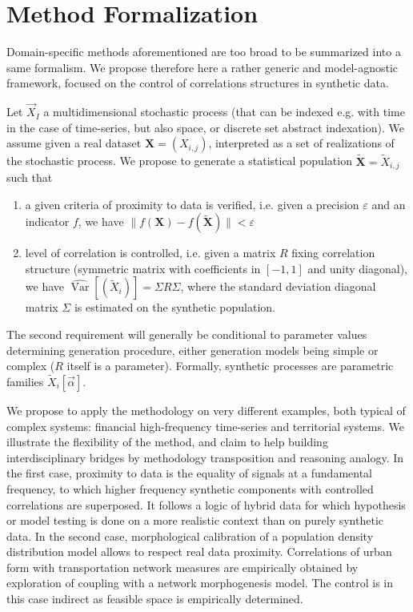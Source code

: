 \documentclass{article}
\DeclareMathOperator{\Var}{Var}
\newcommand{\norm}[1]{\| #1 \|}
\begin{document}
\section*{Method Formalization}


Domain-specific methods aforementioned are too broad to be summarized into a same formalism. We propose therefore here a rather generic and model-agnostic framework, focused on the control of correlations structures in synthetic data.

Let $\vec{X}_I$ a multidimensional stochastic process (that can be indexed e.g. with time in the case of time-series, but also space, or discrete set abstract indexation). We assume given a real dataset $\mathbf{X}=(X_{i,j})$, interpreted as a set of realizations of the stochastic process. We propose to generate a statistical population $\mathbf{\tilde{X}}=\tilde{X}_{i,j}$ such that
\begin{enumerate}
\item a given criteria of proximity to data is verified, i.e. given a precision $\varepsilon$ and an indicator $f$, we have $\norm{f(\mathbf{X})-f(\mathbf{\tilde{X}})} < \varepsilon$
\item level of correlation is controlled, i.e. given a matrix $R$ fixing correlation structure (symmetric matrix with coefficients in $[-1,1]$ and unity diagonal), we have $\hat{\Var{}}\left[(\tilde{X}_i)\right] = \Sigma R \Sigma$, where the standard deviation diagonal matrix $\Sigma$ is estimated on the synthetic population.
\end{enumerate}


The second requirement will generally be conditional to parameter values determining generation procedure, either generation models being simple or complex ($R$ itself is a parameter). Formally, synthetic processes are parametric families $\tilde{X}_i[\vec{\alpha}]$.

We propose to apply the methodology on very different examples, both typical of complex systems: financial high-frequency time-series and territorial systems. We illustrate the flexibility of the method, and claim to help building interdisciplinary bridges by methodology transposition and reasoning analogy. In the first case, proximity to data is the equality of signals at a fundamental frequency, to which higher frequency synthetic components with controlled correlations are superposed. It follows a logic of hybrid data for which hypothesis or model testing is done on a more realistic context than on purely synthetic data. In the second case, morphological calibration of a population density distribution model allows to respect real data proximity. Correlations of urban form with transportation network measures are empirically obtained by exploration of coupling with a network morphogenesis model. The control is in this case indirect as feasible space is empirically determined.
\end{document}
